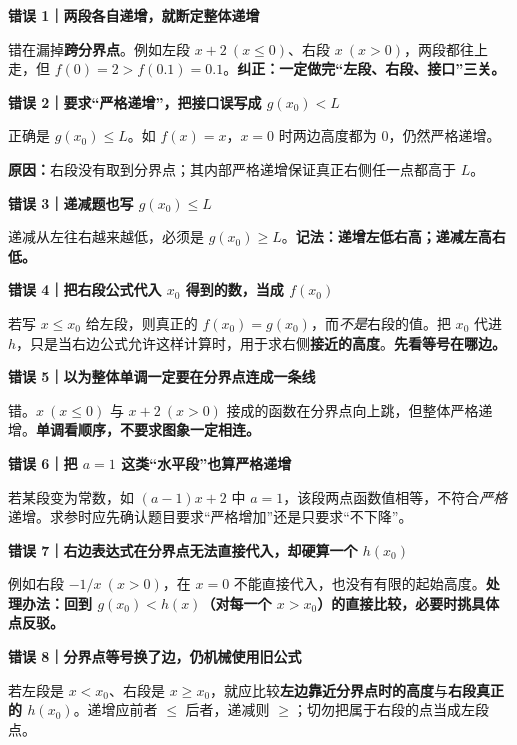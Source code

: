 \clearpage
\begin{trapbox}
\textbf{\textcolor{CTrap}{错误 1｜两段各自递增，就断定整体递增}}



错在漏掉\textbf{跨分界点}。例如左段 $x+2\ (x\le0)$、右段 $x\ (x>0)$，两段都往上走，但 $f(0)=2>f(0.1)=0.1$。\textbf{纠正：一定做完“左段、右段、接口”三关。}

\medskip
\textbf{\textcolor{CTrap}{错误 2｜要求“严格递增”，把接口误写成 $g(x_0)<L$}}

正确是 $g(x_0)\le L$。如 $f(x)=x$，$x=0$ 时两边高度都为 $0$，仍然严格递增。

\textbf{原因：}右段没有取到分界点；其内部严格递增保证真正右侧任一点都高于 $L$。

\medskip
\end{trapbox}
\clearpage
\begin{trapbox}
\textbf{\textcolor{CTrap}{错误 3｜递减题也写 $g(x_0)\le L$}}



递减从左往右越来越低，必须是 $g(x_0)\ge L$。\textbf{记法：递增左低右高；递减左高右低。}

\medskip
\end{trapbox}
\clearpage
\begin{trapbox}
\textbf{\textcolor{CTrap}{错误 4｜把右段公式代入 $x_0$ 得到的数，当成 $f(x_0)$}}



若写 $x\le x_0$ 给左段，则真正的 $f(x_0)=g(x_0)$，而\emph{不是}右段的值。把 $x_0$ 代进 $h$，只是当右边公式允许这样计算时，用于求右侧\textbf{接近的高度}。\textbf{先看等号在哪边。}

\medskip
\textbf{\textcolor{CTrap}{错误 5｜以为整体单调一定要在分界点连成一条线}}

错。$x\ (x\le0)$ 与 $x+2\ (x>0)$ 接成的函数在分界点向上跳，但整体严格递增。\textbf{单调看顺序，不要求图象一定相连。}

\medskip
\end{trapbox}
\clearpage
\begin{trapbox}
\textbf{\textcolor{CTrap}{错误 6｜把 $a=1$ 这类“水平段”也算严格递增}}



若某段变为常数，如 $(a-1)x+2$ 中 $a=1$，该段两点函数值相等，不符合\emph{严格}递增。求参时应先确认题目要求“严格增加”还是只要求“不下降”。

\medskip
\end{trapbox}
\clearpage
\begin{trapbox}
\textbf{\textcolor{CTrap}{错误 7｜右边表达式在分界点无法直接代入，却硬算一个 $h(x_0)$}}



例如右段 $-1/x\ (x>0)$，在 $x=0$ 不能直接代入，也没有有限的起始高度。\textbf{处理办法：回到 $g(x_0)<h(x)$（对每一个 $x>x_0$）的直接比较，必要时挑具体点反驳。}

\medskip
\textbf{\textcolor{CTrap}{错误 8｜分界点等号换了边，仍机械使用旧公式}}

若左段是 $x<x_0$、右段是 $x\ge x_0$，就应比较\textbf{左边靠近分界点时的高度}与\textbf{右段真正的 $h(x_0)$}。递增应前者 $\le$ 后者，递减则 $\ge$；切勿把属于右段的点当成左段点。
\end{trapbox}
